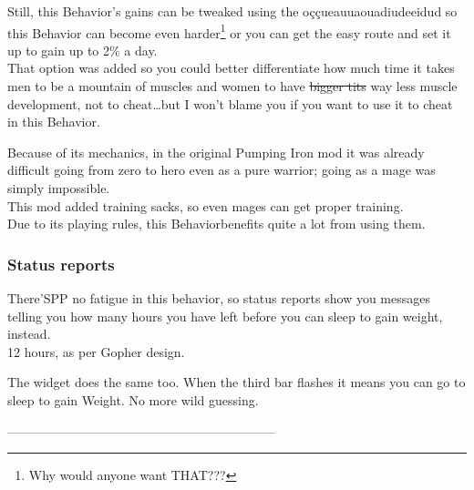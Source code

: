 \documentclass[11pt]{article}
\newcommand{\w}{Weight}
\newcommand{\B}{Behavior}
\newcommand{\PI}{Pumping Iron}
\begin{document}
Still, this \B's gains can be tweaked using the oççueauuaouadiudeeidud so this \B{} can become even harder\footnote{Why would anyone want THAT???} or you can get the easy route and set it up to gain up to 2\% a day.\\
That option was added so you could better differentiate how much time it takes men to be a mountain of muscles and women to have \sout{bigger tits} way less muscle development, not to cheat\ldots but I won't blame you if you want to use it to cheat in this \B.

Because of its mechanics, in the original \PI{} mod it was already difficult going from zero to hero even as a pure warrior; going as a mage was simply impossible.\\
This mod added training sacks, so even mages can get proper training. \\
Due to its playing rules, this \B benefits quite a lot from using them.

\subsubsection{Status reports}
There'SPP no fatigue in this behavior, so status reports show you messages telling you how many hours you have left before you can sleep to gain weight, instead.\\
12 hours, as per Gopher design.

The widget does the same too. When the third bar flashes it means you can go to sleep to gain \w. No more wild guessing.

---------------------------------------------------------------
\end{document}
